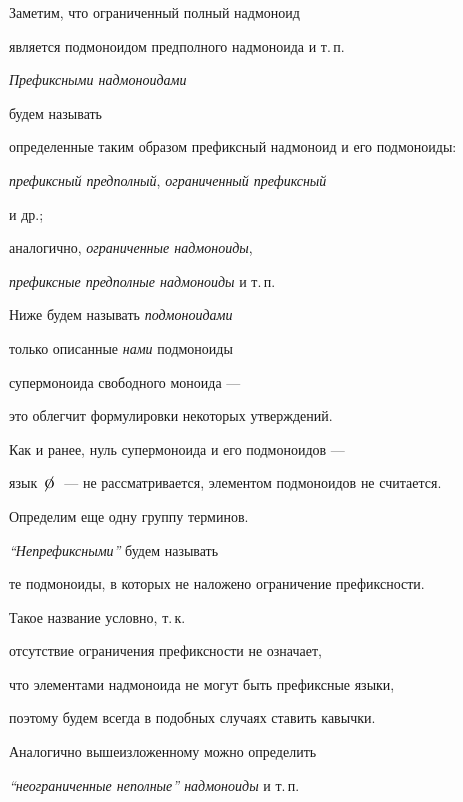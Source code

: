  Заметим, что ограниченный полный надмоноид


 является подмоноидом предполного надмоноида и т.\,п.


\setcounter{footnote}{0}





 {\it Префиксными надмоноидами\/}


будем называть


 определенные таким образом префиксный надмоноид и его подмоноиды:


 {\it префиксный предполный\/}, {\it ограниченный префиксный\/}


 и др.;


 аналогично, {\it ограниченные надмоноиды},


 {\it префиксные предполные надмоноиды} и т.\,п.





 Ниже будем называть {\it подмоноидами\/}


 только описанные {\it нами\/} подмоноиды


 супермоноида свободного моноида ---


 это облегчит формулировки некоторых утверждений.


 Как и ранее, нуль супермоноида и его подмоноидов ---


 язык $\mbox{\large $\not\!\mbox{\Large o}\;$}$ --- не рассматривается, элементом подмоноидов не считается.





 Определим еще одну группу терминов. \label{termino2}


 {\it ``Непрефиксными''} будем называть


 те подмоноиды, в которых не наложено ограничение префиксности.


 Такое название условно, т.\,к.


отсутствие ограничения префиксности не означает,


 что элементами надмоноида не могут быть префиксные языки,


 поэтому будем всегда в подобных случаях ставить кавычки.


 Аналогично вышеизложенному можно определить


 {\it ``неограниченные неполные'' надмоноиды\/} и т.\,п.











